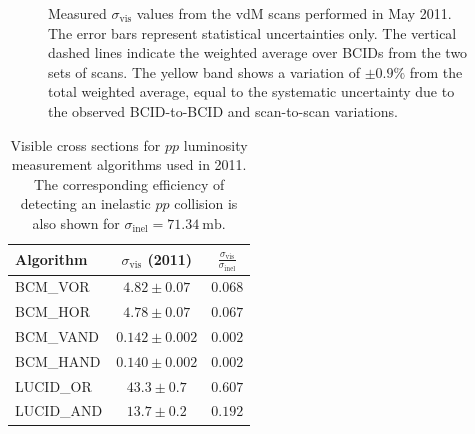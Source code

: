 \begin{figure}[htbp]
	\centering
	\caption{Measured $\sigma_{\mathrm{vis}}$ values from the vdM scans performed in May 2011. The error bars represent statistical uncertainties only. The vertical dashed lines indicate the weighted average over BCIDs from the two sets of scans. The yellow band shows a variation of $\pm0.9\%$ from the total weighted average, equal to the systematic uncertainty due to the observed BCID-to-BCID and scan-to-scan variations.}
	\label{fig:reco-vdm-sigmavis-bcm-2011}
\end{figure}


\begin{table}[htbp]
	\centering
	\begin{tabular}{|l|c|c|}
		\hline
		Algorithm & $\sigma_{\mathrm{vis}}$ (2011) & $\frac{\sigma_{\mathrm{vis}}}{\sigma_{\mathrm{inel}}}$ \\
		\hline
		BCM\_VOR					&	$4.82\pm0.07$	&	$0.068$ \\
		\hline
		BCM\_HOR					&	$4.78\pm0.07$	&	$0.067$ \\
		\hline
		BCM\_VAND					&	$0.142\pm0.002$	&	$0.002$ \\
		\hline
		BCM\_HAND					&	$0.140\pm0.002$	&	$0.002$ \\
		\hline
		LUCID\_OR					&	$43.3\pm0.7$	&	$0.607$ \\
		\hline
		LUCID\_AND					&	$13.7\pm0.2$	&	$0.192$ \\
		\hline
	\end{tabular}
	\caption{Visible cross sections for $pp$ luminosity measurement algorithms used in 2011. The corresponding efficiency of detecting an inelastic $pp$ collision is also shown for $\sigma_{\mathrm{inel}}=\SI{71.34}{\milli\barn}$.}
	\label{table:reco-luminosity-sigmavis-summary}
\end{table}


